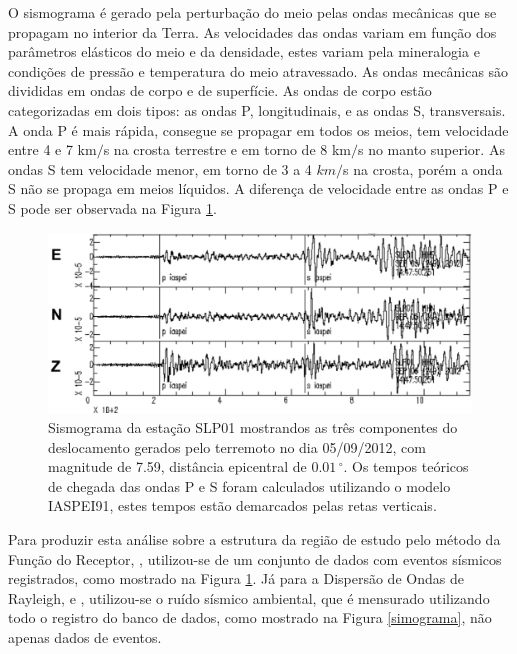 O sismograma é gerado pela perturbação do meio pelas ondas  mecânicas que se propagam no interior da Terra. As velocidades das ondas variam em função dos parâmetros elásticos do meio e da densidade, estes variam pela mineralogia e condições de pressão e temperatura do meio atravessado. As ondas mecânicas são divididas em ondas de corpo e de superfície. As ondas de corpo estão categorizadas em dois tipos: as ondas P, longitudinais, e as ondas S, transversais. A onda P é mais rápida, consegue se propagar em todos os meios, tem velocidade entre 4 e 7 km$/$s na crosta terrestre e em torno de 8 km$/$s no manto superior. As ondas S tem velocidade menor, em torno de 3 a 4 $km/$s na crosta, porém a onda S não se propaga em meios líquidos. A diferença de velocidade entre as ondas P e S pode ser observada na Figura \ref{simograma_componentes}.

\begin{figure}[!ht]
\centering
\includegraphics[scale=0.6]{Figs/sismograma.png}
\caption{Sismograma da estação SLP01 mostrandos as três componentes do deslocamento gerados pelo terremoto no dia 05/09/2012, com magnitude de 7.59, distância epicentral de $0.01\,^{\circ}$. Os tempos teóricos de chegada das ondas P e S foram calculados utilizando o modelo IASPEI91, estes tempos estão demarcados pelas retas verticais.}
\label{simograma_componentes}
\end{figure}

Para produzir esta análise sobre a estrutura da região de estudo pelo método da Função do Receptor, \cite{langston_structure_1979}, utilizou-se de um conjunto de dados com eventos sísmicos registrados, como mostrado na Figura \ref{simograma_componentes}. Já para a Dispersão de Ondas de Rayleigh, \cite{campillo_long-range_2003} e \cite{shapiro_emergence_2004}, utilizou-se o ruído sísmico ambiental, que é mensurado utilizando todo o registro do banco de dados, como mostrado na Figura \ref{simograma}, não apenas dados de eventos.

